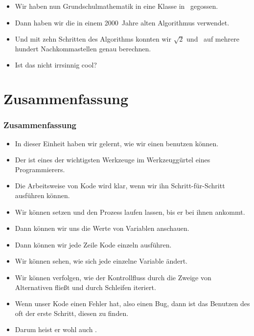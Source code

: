 \documentclass[aspectratio=169,mathserif,notheorems]{beamer}%
\begin{document}
\begin{frame}[t]
{{\begin{itemize}
{}%
%
%
%
\item<17-> Wir haben nun Grundschulmathematik in eine Klasse in \python\ gegossen.%
%
\item<18-> Dann haben wir die in einem 2000~Jahre alten Algorithmus verwendet.%
%
\item<19-> Und mit zehn Schritten des Algorithms konnten wir $\sqrt{2}$ und \numberGoldenRatio\ auf mehrere hundert Nachkommastellen genau berechnen.%
%
\item<20-> Ist das nicht irrsinnig cool?%
%
\end{itemize}%
}}%
%
%
%
%
%
%
\end{frame}%
%
\section{Zusammenfassung}%
%
\begin{frame}[t]%
\frametitle{Zusammenfassung}%
%
\begin{itemize}%
\item In dieser Einheit haben wir gelernt, wie wir einen  benutzen können.%
%
\item<2-> Der  ist eines der wichtigsten Werkzeuge im Werkzeuggürtel eines Programmierers.%
%
\item<3-> Die Arbeitsweise von Kode wird klar, wenn wir ihn Schritt-für-Schritt ausführen können.%
%
\item<4-> Wir können  setzen und den Prozess laufen lassen, bis er bei ihnen ankommt.%
%
\item<5-> Dann können wir uns die Werte von Variablen anschauen.%
%
\item<6-> Dann können wir jede Zeile Kode einzeln ausführen.%
%
\item<7-> Wir können sehen, wie sich jede einzelne Variable ändert.%
%
\item<8-> Wir können verfolgen, wie der Kontrollfluss durch die Zweige von Alternativen fließt und durch Schleifen iteriert.%
%
\item<9-> Wenn unser Kode einen Fehler hat, also einen Bug, dann ist das Benutzen des  oft der erste Schritt, diesen zu finden.%
%
\item<10-> Darum heist er wohl auch .%
\end{itemize}%
\end{frame}%
%
\endPresentation%
\end{document}
